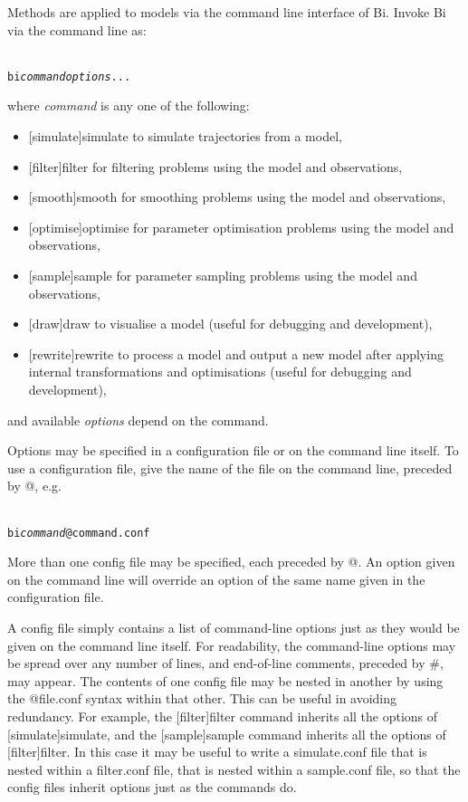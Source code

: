 Methods are applied to models via the command line interface of Bi. Invoke Bi
via the command line as:
\begin{alltt}{\sf
    bi \textit{command} \textit{options} ...
}\end{alltt}
where \textsf{\textit{command}} is any one of the following:
\begin{itemize}
\item \textsf{\hyperref[hyper][simulate]{simulate}} to simulate trajectories
  from a model,
\item \textsf{\hyperref[hyper][filter]{filter}} for filtering problems using the
  model and observations,
\item \textsf{\hyperref[hyper][smooth]{smooth}} for smoothing problems using the
  model and observations,
\item \textsf{\hyperref[hyper][optimise]{optimise}} for parameter optimisation
  problems using the model and observations,
\item \textsf{\hyperref[hyper][sample]{sample}} for parameter sampling
  problems using the model and observations,
\item \textsf{\hyperref[hyper][draw]{draw}} to visualise a model (useful for
  debugging and development),
\item \textsf{\hyperref[hyper][rewrite]{rewrite}} to process a model and
  output a new model after applying internal transformations and optimisations
  (useful for debugging and development),
\end{itemize}
and available \textsf{\textit{options}} depend on the command.

Options may be specified in a configuration file or on the
command line itself. To use a configuration file, give the name of the file on
the command line, preceded by \textsf{@}, e.g.
\begin{alltt}{\sf
    bi \textit{command} @command.conf
}\end{alltt}

More than one config file may be specified, each preceded by \textsf{@}. An
option given on the command line will override an option of the same name
given in the configuration file.

A config file simply contains a list of command-line options just as they
would be given on the command line itself. For readability, the command-line
options may be spread over any number of lines, and end-of-line comments,
preceded by \textsf{\#}, may appear. The contents of one config file may be
nested in another by using the \textsf{@file.conf} syntax within that
other. This can be useful in avoiding redundancy. For example, the
\textsf{\hyperref[hyper][filter]{filter}} command inherits all the options of
\textsf{\hyperref[hyper][simulate]{simulate}}, and the
\textsf{\hyperref[hyper][sample]{sample}} command inherits all the options of
\textsf{\hyperref[hyper][filter]{filter}}. In this case it may be useful to
write a \textsf{simulate.conf} file that is nested within a
\textsf{filter.conf} file, that is nested within a \textsf{sample.conf} file,
so that the config files inherit options just as the commands do.


